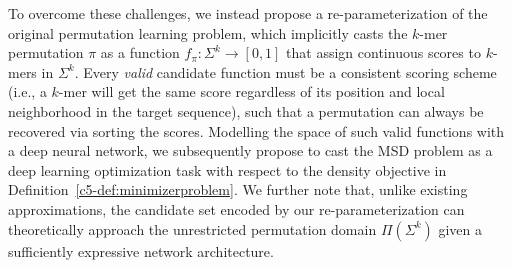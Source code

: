 To overcome these challenges, we instead propose a re-parameterization of the original permutation learning problem, which implicitly casts the $k$-mer permutation $\pi$ as a function $f_\pi: \Sigma^k \rightarrow [0,1]$ that assign continuous scores to $k$-mers in $\Sigma^k$. Every \emph{valid} candidate function must be a consistent scoring scheme (i.e., a $k$-mer will get the same score regardless of its position and local neighborhood in the target sequence), such that a permutation can always be recovered via sorting the scores. Modelling the space of such valid functions with a deep neural network, we subsequently propose to cast the MSD problem as a deep learning optimization task with respect to the density objective in Definition~\ref{c5-def:minimizerproblem}. We further note that, unlike existing approximations, the candidate set encoded by our re-parameterization can theoretically approach the unrestricted permutation domain $\Pi(\Sigma^k)$ given a sufficiently expressive network architecture.

